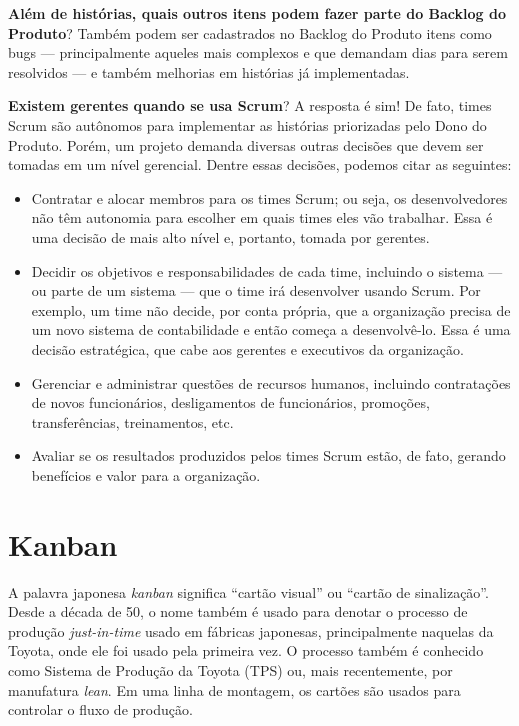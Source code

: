 \documentclass[
  11pt,
  twoside]{book}
\begin{document}
\textbf{Além de histórias, quais outros itens podem fazer parte do
Backlog do Produto}? Também podem ser cadastrados no Backlog do Produto
itens como bugs --- principalmente aqueles mais complexos e que demandam
dias para serem resolvidos --- e também melhorias em histórias já
implementadas.

\textbf{Existem gerentes quando se usa Scrum}? A resposta é sim! De
fato, times Scrum são autônomos para implementar as histórias
priorizadas pelo Dono do Produto. Porém, um projeto demanda diversas
outras decisões que devem ser tomadas em um nível gerencial. Dentre
essas decisões, podemos citar as seguintes:

\begin{itemize}
\item
  Contratar e alocar membros para os times Scrum; ou seja, os
  desenvolvedores não têm autonomia para escolher em quais times eles
  vão trabalhar. Essa é uma decisão de mais alto nível e, portanto,
  tomada por gerentes.
\item
  Decidir os objetivos e responsabilidades de cada time, incluindo o
  sistema --- ou parte de um sistema --- que o time irá desenvolver
  usando Scrum. Por exemplo, um time não decide, por conta própria, que
  a organização precisa de um novo sistema de contabilidade e então
  começa a desenvolvê-lo. Essa é uma decisão estratégica, que cabe aos
  gerentes e executivos da organização.
\item
  Gerenciar e administrar questões de recursos humanos, incluindo
  contratações de novos funcionários, desligamentos de funcionários,
  promoções, transferências, treinamentos, etc.
\item
  Avaliar se os resultados produzidos pelos times Scrum estão, de fato,
  gerando benefícios e valor para a organização.
\end{itemize}

\hypertarget{kanban}{%
\section{Kanban}\label{kanban}}

  A palavra japonesa \emph{kanban} significa
``cartão visual'' ou ``cartão de sinalização''. Desde a década de 50, o
nome também é usado para denotar o processo de produção
\emph{just-in-time} usado em fábricas japonesas, principalmente naquelas
da Toyota, onde ele foi usado pela primeira vez. O processo também é
conhecido como Sistema de Produção da Toyota (TPS) ou, mais
recentemente, por manufatura \emph{lean}. Em uma linha de montagem, os
cartões são usados para controlar o fluxo de produção.
\end{document}
